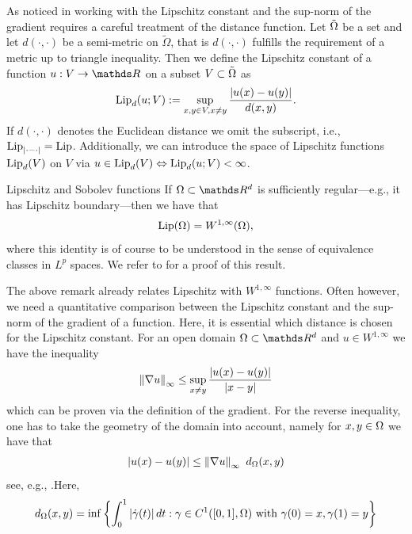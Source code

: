 As noticed in \cite{jensen1993uniqueness} working with the Lipschitz constant and the sup-norm of the gradient requires a careful 
treatment of the distance function. Let $\tilde{\Omega}$ be a set and let $d(\cdot,\cdot)$ be a semi-metric on $\tilde\Omega$, that is $d(\cdot,\cdot)$ fulfills 
the requirement of a metric up to triangle inequality. Then we define the Lipschitz constant of a function $u:V\to \R$ on a subset $V\subset \tilde{\Omega}$ as
%
\begin{align*}
\operatorname{Lip}_d(u; V):= \sup_{x,y\in V, x\neq y} \frac{\left|u(x) - u(y)\right|}{d(x,y)}.
\end{align*}
%
If $d(\cdot,\cdot)$ denotes the Euclidean distance we omit the subscript, i.e., $\operatorname{Lip}_{\left|\cdot -\cdot\right|} = \operatorname{Lip}$. Additionally, we can 
introduce the space of Lipschitz functions $\operatorname{Lip}_d(V)$ on $V$ via 
$u\in \operatorname{Lip}_d(V) \Leftrightarrow \operatorname{Lip}_d(u;V) <\infty$.
%
\begin{remark}{Lipschitz and Sobolev functions}{}
If $\domain\subset\R^d$ is sufficiently regular---e.g., it has Lipschitz boundary---then we have that
%
\begin{align*}
\operatorname{Lip}(\Omega) = W^{1,\infty}(\Omega),
\end{align*}
%
where this identity is of course to be understood in the sense of equivalence classes in $L^p$ spaces. We refer to \cite{evans2018measure} for a proof of this result.
\end{remark}
%
The above remark already relates Lipschitz with $W^{1,\infty}$ functions. Often however, we need a quantitative 
comparison between the Lipschitz constant and the sup-norm of the gradient of a function. Here, it is essential 
which distance is chosen for the Lipschitz constant. For an open domain $\domain\subset\R^d$ and $u\in W^{1,\infty}$ we have the inequality
%
\begin{align*}
\left\|\nabla u\right\|_\infty \leq \sup_{x\neq y} \frac{\left|u(x) - u(y)\right|}{\left|x-y\right|}
\end{align*}
%
which can be proven via the definition of the gradient. For the reverse inequality, one has to take the geometry of the domain into account, namely for $x,y\in\Omega$ we have that
%
\begin{align}\label{eq:LipGrad}
\left|u(x) - u(y)\right| \leq \left\|\nabla u\right\|_\infty\ d_\Omega(x,y)
\end{align}
%
see, e.g., \cite[Prop9.3, Rem. 7]{brezis2011functional}.Here,
%
\begin{align*}
d_\Omega(x,y) = \inf \left\{
\int_0^1 \left|\dot{\gamma}(t)\right| dt : \gamma\in C^1([0,1], \Omega)\text{ with } \gamma(0)=x, \gamma(1) =y
\right\}
\end{align*}
